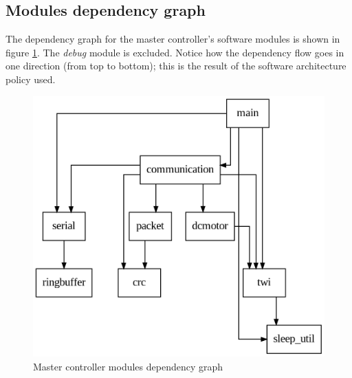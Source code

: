 \documentclass[binding=0.6cm,Lau]{sapthesis}
\makeatletter
\def\maxwidth#1{\ifdim\Gin@nat@width>#1 #1\else\Gin@nat@width\fi}
\makeatother
\begin{document}
\subsection{Modules dependency graph}
The dependency graph for the master controller's software modules is shown in
figure \ref{img:master-deps-graph}. The \emph{debug} module is excluded. Notice
how the dependency flow goes in one direction (from top to bottom); this is the
result of the software architecture policy used.
\begin{figure}[hbp]
\begin{centering}
  \includegraphics[width=\maxwidth{\textwidth}]{img/master-deps}
  \caption{Master controller modules dependency graph}
  \label{img:master-deps-graph}
\end{centering}
\end{figure}
\end{document}
